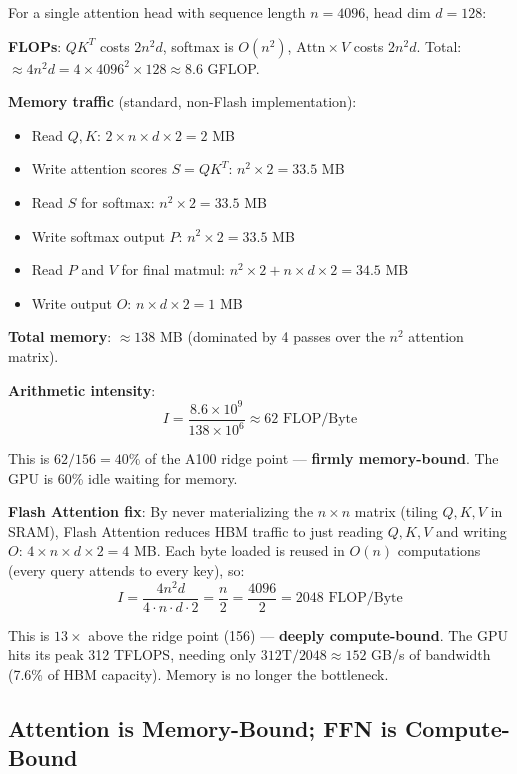 \begin{examplebox}
For a single attention head with sequence length $n=4096$, head dim $d=128$:

\textbf{FLOPs}: $QK^T$ costs $2n^2d$, softmax is $O(n^2)$, $\text{Attn} \times V$ costs $2n^2d$. Total: $\approx 4n^2 d = 4 \times 4096^2 \times 128 \approx 8.6$ GFLOP.

\textbf{Memory traffic} (standard, non-Flash implementation):

\begin{itemize}
  \item Read $Q, K$: $2 \times n \times d \times 2 = 2$ MB
  \item Write attention scores $S = QK^T$: $n^2 \times 2 = 33.5$ MB
  \item Read $S$ for softmax: $n^2 \times 2 = 33.5$ MB
  \item Write softmax output $P$: $n^2 \times 2 = 33.5$ MB
  \item Read $P$ and $V$ for final matmul: $n^2 \times 2 + n \times d \times 2 = 34.5$ MB
  \item Write output $O$: $n \times d \times 2 = 1$ MB
\end{itemize}

\textbf{Total memory}: $\approx 138$ MB (dominated by 4 passes over the $n^2$ attention matrix).

\textbf{Arithmetic intensity}: 
\[
I = \frac{8.6 \times 10^9}{138 \times 10^6} \approx 62 \text{ FLOP/Byte}
\]

This is $62/156 = 40\%$ of the A100 ridge point --- \textbf{firmly memory-bound}. The GPU is 60\% idle waiting for memory.

\textbf{Flash Attention fix}: By never materializing the $n \times n$ matrix (tiling $Q, K, V$ in SRAM), Flash Attention reduces HBM traffic to just reading $Q, K, V$ and writing $O$: $4 \times n \times d \times 2 = 4$ MB. Each byte loaded is reused in $O(n)$ computations (every query attends to every key), so: 
\[
I = \frac{4n^2 d}{4 \cdot n \cdot d \cdot 2} = \frac{n}{2} = \frac{4096}{2} = 2048 \text{ FLOP/Byte}
\]

This is $13\times$ above the ridge point (156) --- \textbf{deeply compute-bound}. The GPU hits its peak 312 TFLOPS, needing only $312\text{T}/2048 \approx 152$ GB/s of bandwidth (7.6\% of HBM capacity). Memory is no longer the bottleneck.
\end{examplebox}

\subsection{Attention is Memory-Bound; FFN is Compute-Bound}
\label{attention-is-memory-bound-ffn-is-compute-bound}

